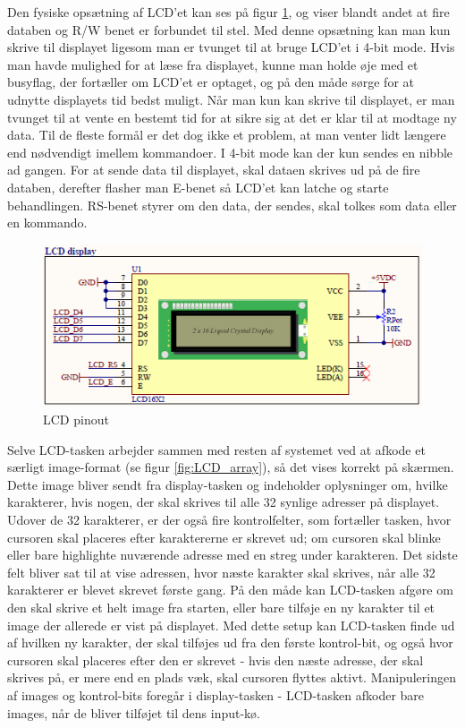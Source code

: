 Den fysiske opsætning af LCD'et kan ses på figur \ref{fig:LCD}, og viser blandt andet at fire databen og R/W benet er forbundet til stel. Med denne opsætning kan man kun skrive til displayet ligesom man er tvunget til at bruge LCD'et i 4-bit mode. Hvis man havde mulighed for at læse fra displayet, kunne man holde øje med et busyflag, der fortæller om LCD'et er optaget, og på den måde sørge for at udnytte displayets tid bedst muligt. Når man kun kan skrive til displayet, er man tvunget til at vente en bestemt tid for at sikre sig at det er klar til at modtage ny data. Til de fleste formål er det dog ikke et problem, at man venter lidt længere end nødvendigt imellem kommandoer. I 4-bit mode kan der kun sendes en nibble ad gangen. For at sende data til displayet, skal dataen skrives ud på de fire databen, derefter flasher man E-benet så LCD'et kan latche og starte behandlingen. RS-benet styrer om den data, der sendes, skal tolkes som data eller en kommando. 

\begin{figure}[ht]
			\begin{center}
			\includegraphics[scale=0.9]{Billeder/LCD.PNG}
			\end{center}
			\caption{LCD pinout}
			\label{fig:LCD}
\end{figure}

Selve LCD-tasken arbejder sammen med resten af systemet ved at afkode et særligt image-format (se figur \ref{fig:LCD_array}), så det vises korrekt på skærmen. Dette image bliver sendt fra display-tasken og indeholder oplysninger om, hvilke karakterer, hvis nogen, der skal skrives til alle 32 synlige adresser på displayet. Udover de 32 karakterer, er der også fire kontrolfelter, som fortæller tasken, hvor cursoren skal placeres efter karaktererne er skrevet ud; om cursoren skal blinke eller bare highlighte nuværende adresse med en streg under karakteren. Det sidste felt bliver sat til at vise adressen, hvor næste karakter skal skrives, når alle 32 karakterer er blevet skrevet første gang. På den måde kan LCD-tasken afgøre om den skal skrive et helt image fra starten, eller bare tilføje en ny karakter til et image der allerede er vist på displayet. Med dette setup kan LCD-tasken finde ud af hvilken ny karakter, der skal tilføjes ud fra den første kontrol-bit, og også hvor cursoren skal placeres efter den er skrevet - hvis den næste adresse, der skal skrives på, er mere end en plads væk, skal cursoren flyttes aktivt. Manipuleringen af images og kontrol-bits foregår i display-tasken - LCD-tasken afkoder bare images, når de bliver tilføjet til dens input-kø.


